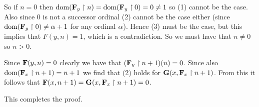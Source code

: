 \begin{solution}
    So if $n=0$ then $\mathrm{dom}(\mathbf{F}_y \restriction n) = \mathrm{dom}(\mathbf{F}_y \restriction 0) = 0 \neq 1$ so (1) cannot be the case.
    Also since $0$ is not a successor ordinal (2) cannot be the case either (since $\mathrm{dom}(\mathbf{F}_y \restriction 0) \neq \alpha+1$ for any ordinal $\alpha$).
    Hence (3) must be the case, but this implies that $F(y,n) = 1$, which is a contradiction.
    So we must have that $n \neq 0$ so $n > 0$.

    Since $\mathbf{F}(y, n) = 0$ clearly we have that $(\mathbf{F}_y \restriction n+1)(n) = 0$.
    Since also $\mathrm{dom}(\mathbf{F}_x \restriction n+1) = n+1$ we find that (2) holds for $\mathbf{G}(x, \mathbf{F}_x \restriction n+1)$.
    From this it follows that $\mathbf{F}(x,n+1) = \mathbf{G}(x, \mathbf{F}_x \restriction n+1) = 0$.

    This completes the proof. \qedsymbol
\end{solution}


